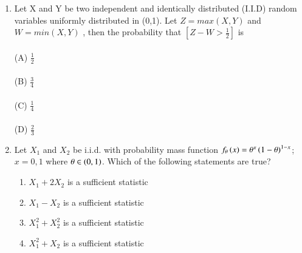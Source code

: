 \begin{enumerate}[label=\thesection.\arabic*.,ref=\thesection.\theenumi]
\item Let X and Y be two independent and identically distributed (I.I.D) random variables uniformly distributed in (0,1). Let $Z = max(X,Y)$ and $W = min(X,Y)$ , then the probability that $[Z-W >\frac{1}{2}]$ is\\
\\(A) $\frac{1}{2}$\\
\\(B) $\frac{3}{4}$\\
\\(C) $\frac{1}{4}$\\
\\(D) $\frac{2}{3}$    
%
\solution

%
\item Let $X_1$ and $X_2$ be i.i.d. with probability mass function $f_{\theta}\left(x\right) = \theta^x \left(1-\theta\right)^{1-x}$; $x=0,1$ where $\theta \in \left(0,1\right)$. Which of the following statements are true?
\begin{enumerate}
    \item $X_1 + 2X_2 $ is a sufficient statistic
    \item $X_1 - X_2 $ is a sufficient statistic
    \item $X_1^2 + X_2^2 $ is a sufficient statistic
    \item $X_1^2 + X_2 $ is a sufficient statistic
\end{enumerate}
%
\solution



\end{enumerate}
